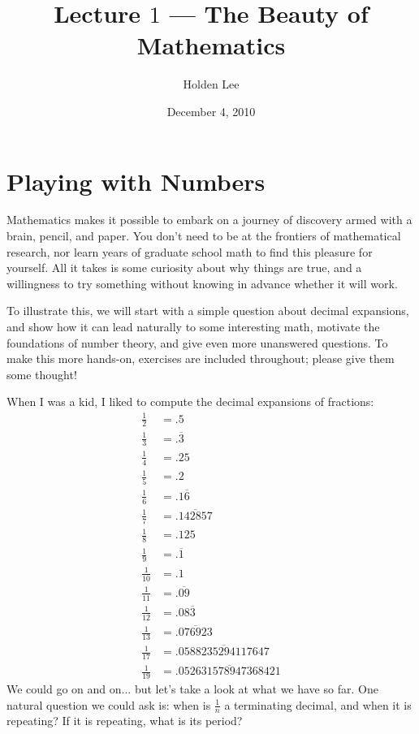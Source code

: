 \documentclass[12pt,twoside]{article}
\theoremstyle{norm}
\newcommand{\rc}[1]{\frac{1}{#1}}
\begin{document}
\title{Lecture $1$ --- The Beauty of Mathematics}%
\author{Holden Lee}
\date{December 4, 2010}%
\maketitle
\thispagestyle{empty}
\section{Playing with Numbers}
Mathematics makes it possible to embark on a journey of discovery armed with a brain, pencil, and paper. You don't need to be at the frontiers of mathematical research, nor learn years of graduate school math to find this pleasure for yourself. All it takes is some curiosity about why things are true, and a willingness to try something without knowing in advance whether it will work.

To illustrate this, we will start with a simple question about decimal expansions, and show how it can lead naturally to some interesting math, motivate the foundations of number theory, and give even more unanswered questions. To make this more hands-on, exercises are included throughout; please give them some thought!

When I was a kid, I liked to compute the decimal expansions of fractions:
\begin{align*}
\rc{2}&=.5\\
\rc{3}&=.\overline{3}\\
\rc{4}&=.25\\
\rc{5}&=.2\\
\rc{6}&=.1\overline{6}\\
\rc{7}&=.\overline{142857}\\
\rc{8}&=.125\\
\rc{9}&=.\overline{1}\\
\rc{10}&=.1\\
\rc{11}&=.\overline{09}\\
\rc{12}&=.08\overline{3}\\
\rc{13}&=.\overline{076923}\\
\rc{17}&=.\overline{0588235294117647}\\
\rc{19}&=.\overline{052631578947368421}
\end{align*}
We could go on and on... but let's take a look at what we have so far. One natural question we could ask is: when is $\rc{n}$ a terminating decimal, and when it is repeating? If it is repeating, what is its period?
\end{document}
